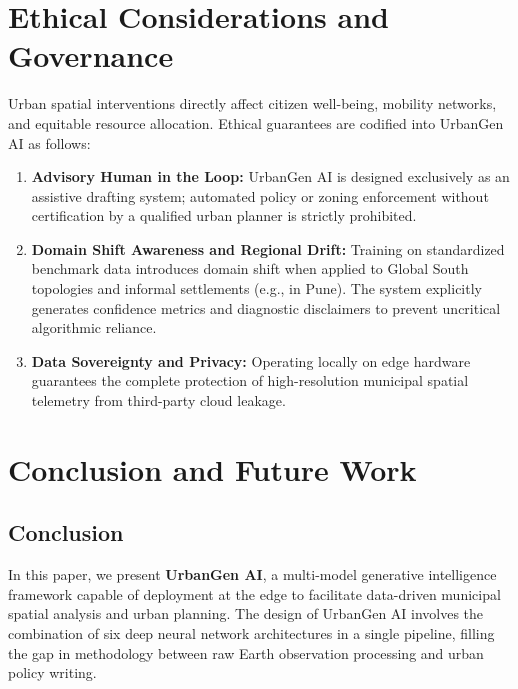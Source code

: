 \documentclass[conference]{IEEEtran}
\begin{document}
\section{Ethical Considerations and Governance}
Urban spatial interventions directly affect citizen well-being, mobility networks, and equitable resource allocation. Ethical guarantees are codified into UrbanGen AI as follows:
\begin{enumerate}
    \item \textbf{Advisory Human in the Loop:} UrbanGen AI is designed exclusively as an assistive drafting system; automated policy or zoning enforcement without certification by a qualified urban planner is strictly prohibited.
    \item \textbf{Domain Shift Awareness and Regional Drift:} Training on standardized benchmark data introduces domain shift when applied to Global South topologies and informal settlements (e.g., in Pune). The system explicitly generates confidence metrics and diagnostic disclaimers to prevent uncritical algorithmic reliance.
    \item \textbf{Data Sovereignty and Privacy:} Operating locally on edge hardware guarantees the complete protection of high-resolution municipal spatial telemetry from third-party cloud leakage.
\end{enumerate}

\section{Conclusion and Future Work}
\subsection{Conclusion}
In this paper, we present \textbf{UrbanGen AI}, a multi-model generative intelligence framework capable of deployment at the edge to facilitate data-driven municipal spatial analysis and urban planning. The design of UrbanGen AI involves the combination of six deep neural network architectures in a single pipeline, filling the gap in methodology between raw Earth observation processing and urban policy writing.
\end{document}
